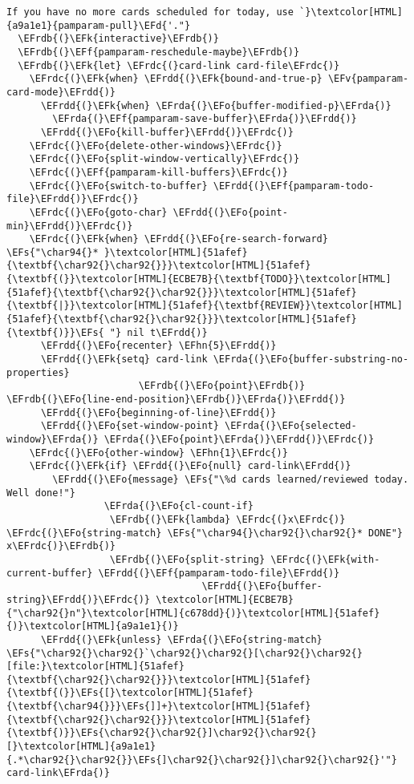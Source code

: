 \documentclass[a4wide,10pt]{article}
\newcommand{\EFs}[1]{\textcolor{EFs}{#1}} %
\newcommand{\EFd}[1]{\textcolor{EFd}{#1}} %
\newcommand{\EFk}[1]{\textcolor{EFk}{#1}} %
\newcommand{\EFf}[1]{\textcolor{EFf}{#1}} %
\newcommand{\EFv}[1]{\textcolor{EFv}{#1}} %
\newcommand{\EFo}[1]{\textcolor{EFo}{#1}} %
\newcommand{\EFhn}[1]{\textcolor{EFhn}{\textbf{#1}}} %
\newcommand{\EFrda}[1]{\textcolor{EFrda}{#1}} %
\newcommand{\EFrdb}[1]{\textcolor{EFrdb}{#1}} %
\newcommand{\EFrdc}[1]{\textcolor{EFrdc}{#1}} %
\newcommand{\EFrdd}[1]{\textcolor{EFrdd}{#1}} %
\begin{document}
\begin{Code}
\begin{Verbatim}
If you have no more cards scheduled for today, use `}\textcolor[HTML]{a9a1e1}{pamparam-pull}\EFd{'."}
  \EFrdb{(}\EFk{interactive}\EFrdb{)}
  \EFrdb{(}\EFf{pamparam-reschedule-maybe}\EFrdb{)}
  \EFrdb{(}\EFk{let} \EFrdc{(}card-link card-file\EFrdc{)}
    \EFrdc{(}\EFk{when} \EFrdd{(}\EFk{bound-and-true-p} \EFv{pamparam-card-mode}\EFrdd{)}
      \EFrdd{(}\EFk{when} \EFrda{(}\EFo{buffer-modified-p}\EFrda{)}
        \EFrda{(}\EFf{pamparam-save-buffer}\EFrda{)}\EFrdd{)}
      \EFrdd{(}\EFo{kill-buffer}\EFrdd{)}\EFrdc{)}
    \EFrdc{(}\EFo{delete-other-windows}\EFrdc{)}
    \EFrdc{(}\EFo{split-window-vertically}\EFrdc{)}
    \EFrdc{(}\EFf{pamparam-kill-buffers}\EFrdc{)}
    \EFrdc{(}\EFo{switch-to-buffer} \EFrdd{(}\EFf{pamparam-todo-file}\EFrdd{)}\EFrdc{)}
    \EFrdc{(}\EFo{goto-char} \EFrdd{(}\EFo{point-min}\EFrdd{)}\EFrdc{)}
    \EFrdc{(}\EFk{when} \EFrdd{(}\EFo{re-search-forward} \EFs{"\char94{}* }\textcolor[HTML]{51afef}{\textbf{\char92{}\char92{}}}\textcolor[HTML]{51afef}{\textbf{(}}\textcolor[HTML]{ECBE7B}{\textbf{TODO}}\textcolor[HTML]{51afef}{\textbf{\char92{}\char92{}}}\textcolor[HTML]{51afef}{\textbf{|}}\textcolor[HTML]{51afef}{\textbf{REVIEW}}\textcolor[HTML]{51afef}{\textbf{\char92{}\char92{}}}\textcolor[HTML]{51afef}{\textbf{)}}\EFs{ "} nil t\EFrdd{)}
      \EFrdd{(}\EFo{recenter} \EFhn{5}\EFrdd{)}
      \EFrdd{(}\EFk{setq} card-link \EFrda{(}\EFo{buffer-substring-no-properties}
                       \EFrdb{(}\EFo{point}\EFrdb{)} \EFrdb{(}\EFo{line-end-position}\EFrdb{)}\EFrda{)}\EFrdd{)}
      \EFrdd{(}\EFo{beginning-of-line}\EFrdd{)}
      \EFrdd{(}\EFo{set-window-point} \EFrda{(}\EFo{selected-window}\EFrda{)} \EFrda{(}\EFo{point}\EFrda{)}\EFrdd{)}\EFrdc{)}
    \EFrdc{(}\EFo{other-window} \EFhn{1}\EFrdc{)}
    \EFrdc{(}\EFk{if} \EFrdd{(}\EFo{null} card-link\EFrdd{)}
        \EFrdd{(}\EFo{message} \EFs{"\%d cards learned/reviewed today. Well done!"}
                 \EFrda{(}\EFo{cl-count-if}
                  \EFrdb{(}\EFk{lambda} \EFrdc{(}x\EFrdc{)} \EFrdc{(}\EFo{string-match} \EFs{"\char94{}\char92{}\char92{}* DONE"} x\EFrdc{)}\EFrdb{)}
                  \EFrdb{(}\EFo{split-string} \EFrdc{(}\EFk{with-current-buffer} \EFrdd{(}\EFf{pamparam-todo-file}\EFrdd{)}
                                  \EFrdd{(}\EFo{buffer-string}\EFrdd{)}\EFrdc{)} \textcolor[HTML]{ECBE7B}{"\char92{}n"}\textcolor[HTML]{c678dd}{)}\textcolor[HTML]{51afef}{)}\textcolor[HTML]{a9a1e1}{)}
      \EFrdd{(}\EFk{unless} \EFrda{(}\EFo{string-match} \EFs{"\char92{}\char92{}`\char92{}\char92{}[\char92{}\char92{}[file:}\textcolor[HTML]{51afef}{\textbf{\char92{}\char92{}}}\textcolor[HTML]{51afef}{\textbf{(}}\EFs{[}\textcolor[HTML]{51afef}{\textbf{\char94{}}}\EFs{]]+}\textcolor[HTML]{51afef}{\textbf{\char92{}\char92{}}}\textcolor[HTML]{51afef}{\textbf{)}}\EFs{\char92{}\char92{}]\char92{}\char92{}[}\textcolor[HTML]{a9a1e1}{.*\char92{}\char92{}}\EFs{]\char92{}\char92{}]\char92{}\char92{}'"} card-link\EFrda{)}

\end{Verbatim}
\end{Code}
\end{document}
